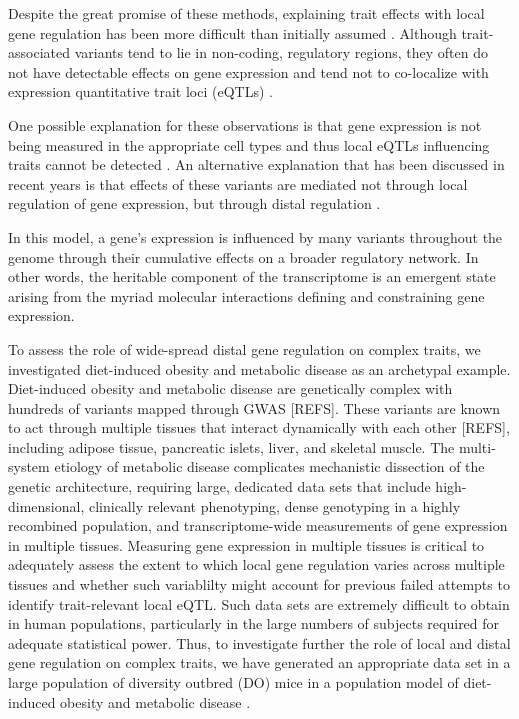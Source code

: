 \documentclass[
]{article}
\begin{document}
Despite the great promise of these methods, explaining trait effects
with local gene regulation has been more difficult than initially
assumed \cite{pmid32912663, pmid36515579}. Although trait-associated
variants tend to lie in non-coding, regulatory regions, they often do
not have detectable effects on gene expression \cite{pmid32912663} and
tend not to co-localize with expression quantitative trait loci (eQTLs)
\cite{pmid36515579, pmid37857933}.

One possible explanation for these observations is that gene expression
is not being measured in the appropriate cell types and thus local eQTLs
influencing traits cannot be detected \cite{pmid32912663}. An
alternative explanation that has been discussed in recent years is that
effects of these variants are mediated not through local regulation of
gene expression, but through distal regulation
\cite{pmid37857933, pmid32424349, 
pmid32831138, pmid30950127}.

In this model, a gene's expression is influenced by many variants
throughout the genome through their cumulative effects on a broader
regulatory network. In other words, the heritable component of the
transcriptome is an emergent state arising from the myriad molecular
interactions defining and constraining gene expression.

To assess the role of wide-spread distal gene regulation on complex
traits, we investigated diet-induced obesity and metabolic disease as an
archetypal example. Diet-induced obesity and metabolic disease are
genetically complex with hundreds of variants mapped through GWAS
{[}REFS{]}. These variants are known to act through multiple tissues
that interact dynamically with each other {[}REFS{]}, including adipose
tissue, pancreatic islets, liver, and skeletal muscle. The multi-system
etiology of metabolic disease complicates mechanistic dissection of the
genetic architecture, requiring large, dedicated data sets that include
high-dimensional, clinically relevant phenotyping, dense genotyping in a
highly recombined population, and transcriptome-wide measurements of
gene expression in multiple tissues. Measuring gene expression in
multiple tissues is critical to adequately assess the extent to which
local gene regulation varies across multiple tissues and whether such
variablilty might account for previous failed attempts to identify
trait-relevant local eQTL. Such data sets are extremely difficult to
obtain in human populations, particularly in the large numbers of
subjects required for adequate statistical power. Thus, to investigate
further the role of local and distal gene regulation on complex traits,
we have generated an appropriate data set in a large population of
diversity outbred (DO) mice \cite{pmid22892839} in a population model of
diet-induced obesity and metabolic disease \cite{pmid29567659}.
\end{document}

